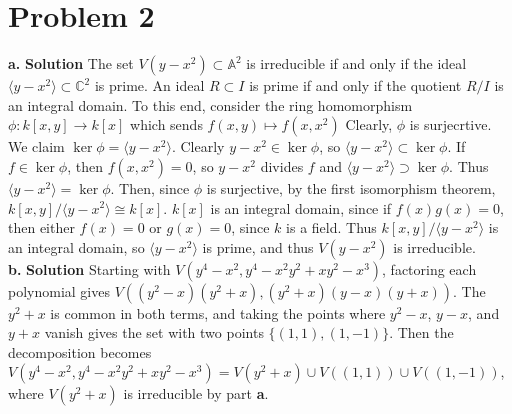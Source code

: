 \documentclass{article}
\begin{document}
\section{Problem 2}
\textbf{a. } \textbf{Solution } The set $V(y - x^2) \subset \mathbb{A}^2$ is irreducible if and only if the ideal $\langle y - x^2 \rangle \subset \mathbb{C}^2$ is prime. 
An ideal $ R \subset I$ is prime if and only if the quotient $R / I$ is an integral domain. To this end, consider the ring homomorphism $\phi : k[x, y] \to k[x]$ which sends $f(x, y) \mapsto f(x, x^2)$
Clearly, $\phi$ is surjecrtive. We claim $\ker \phi = \langle y -x^2 \rangle$. Clearly $y - x^2 \in \ker \phi$, so $\langle y - x^2 \rangle \subset \ker \phi$. 
If $f \in \ker \phi$, then $f(x, x^2) = 0$, so $y - x^2$ divides $f$ and $\langle y - x^2 \rangle \supset \ker \phi$. Thus $\langle y - x^2 \rangle = \ker \phi$. Then, since $\phi$ is surjective,
by the first isomorphism theorem, $k[x, y] / \langle y - x^2 \rangle \cong k[x]$. $k[x]$ is an integral domain, since if $f(x)g(x) = 0$, then either $f(x) = 0$ or $g(x) = 0$, since $k$ is a field. 
Thus $k[x, y] / \langle y - x^2 \rangle$ is an integral domain, so $\langle y - x^2 \rangle$ is prime, and thus $V(y - x^2)$ is irreducible. \\
\textbf{b. } \textbf{Solution } Starting with $V(y^4 - x^2, y^4 - x^2y^2 + xy^2 -x^3)$, factoring each polynomial gives $V \left(  (y^2-x)(y^2+x), (y^2+x)(y-x)(y+x)   \right)$. 
The $y^2 + x$ is common in both terms, and taking the points where $y^2 - x$, $y-x$, and $y+x$ vanish gives the set with two points $\{(1, 1), (1, -1)\}$. Then the decomposition becomes
$ V(y^4 - x^2, y^4 - x^2y^2 + xy^2 -x^3) = V(y^2 + x) \cup V((1, 1)) \cup V((1, -1)) $, where $V(y^2 + x)$ is irreducible by part \textbf{a}. 
\end{document}
